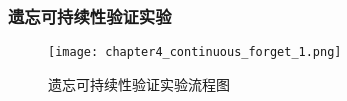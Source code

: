 

\subsubsection{遗忘可持续性验证实验}
\begin{figure}
    \centering
    \texttt{[image: chapter4\_continuous\_forget\_1.png]}
    \caption{遗忘可持续性验证实验流程图}
    \label{fig:chapter4_continuous_forget_1}
\end{figure}

